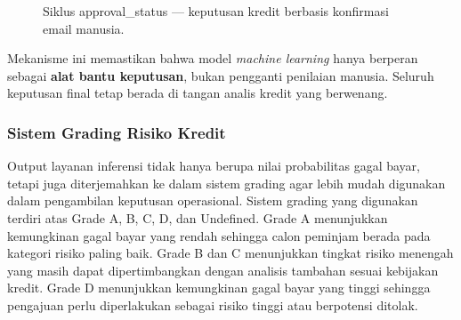 \begin{figure}[H]
\centering
{}
\caption{Siklus approval\_status --- keputusan kredit berbasis konfirmasi email manusia.}
\label{fig:hitl-flow}
\end{figure}

Mekanisme ini memastikan bahwa model \textit{machine learning} hanya berperan sebagai \textbf{alat bantu keputusan}, bukan pengganti penilaian manusia. Seluruh keputusan final tetap berada di tangan analis kredit yang berwenang.

\subsubsection{Sistem Grading Risiko Kredit}
Output layanan inferensi tidak hanya berupa nilai probabilitas gagal bayar, tetapi juga diterjemahkan ke dalam sistem grading agar lebih mudah digunakan dalam pengambilan keputusan operasional. Sistem grading yang digunakan terdiri atas Grade A, B, C, D, dan Undefined. Grade A menunjukkan kemungkinan gagal bayar yang rendah sehingga calon peminjam berada pada kategori risiko paling baik. Grade B dan C menunjukkan tingkat risiko menengah yang masih dapat dipertimbangkan dengan analisis tambahan sesuai kebijakan kredit. Grade D menunjukkan kemungkinan gagal bayar yang tinggi sehingga pengajuan perlu diperlakukan sebagai risiko tinggi atau berpotensi ditolak.

